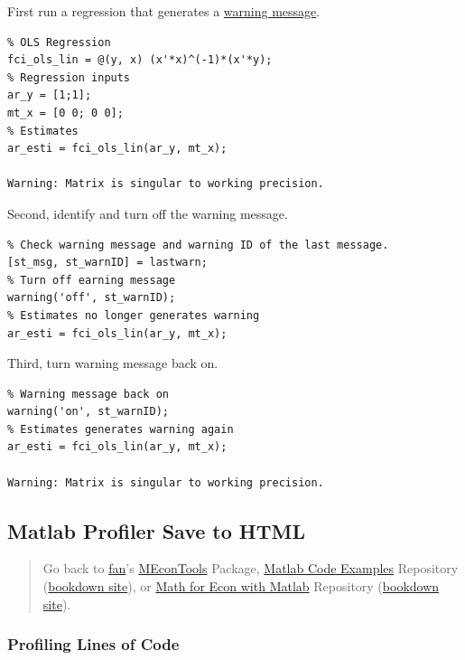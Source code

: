 \documentclass[
]{book}
\begin{document}
First run a regression that generates a \href{https://www.mathworks.com/help/matlab/ref/lastwarn.html}{warning
message}.

\begin{verbatim}
% OLS Regression
fci_ols_lin = @(y, x) (x'*x)^(-1)*(x'*y);
% Regression inputs
ar_y = [1;1];
mt_x = [0 0; 0 0];
% Estimates
ar_esti = fci_ols_lin(ar_y, mt_x);

Warning: Matrix is singular to working precision.
\end{verbatim}

Second, identify and turn off the warning message.

\begin{verbatim}
% Check warning message and warning ID of the last message.
[st_msg, st_warnID] = lastwarn;
% Turn off earning message
warning('off', st_warnID);
% Estimates no longer generates warning
ar_esti = fci_ols_lin(ar_y, mt_x);
\end{verbatim}

Third, turn warning message back on.

\begin{verbatim}
% Warning message back on
warning('on', st_warnID);
% Estimates generates warning again
ar_esti = fci_ols_lin(ar_y, mt_x);

Warning: Matrix is singular to working precision.
\end{verbatim}

\hypertarget{matlab-profiler-save-to-html}{%
\subsection{Matlab Profiler Save to HTML}\label{matlab-profiler-save-to-html}}

\begin{quote}
Go back to \href{http://fanwangecon.github.io/}{fan}'s \href{https://fanwangecon.github.io/MEconTools/}{MEconTools} Package, \href{https://fanwangecon.github.io/M4Econ/}{Matlab Code Examples} Repository (\href{https://fanwangecon.github.io/M4Econ/bookdown}{bookdown site}), or \href{https://fanwangecon.github.io/Math4Econ/}{Math for Econ with Matlab} Repository (\href{https://fanwangecon.github.io/Math4Econ/bookdown}{bookdown site}).
\end{quote}

\hypertarget{profiling-lines-of-code}{%
\subsubsection{Profiling Lines of Code}\label{profiling-lines-of-code}}
\end{document}

